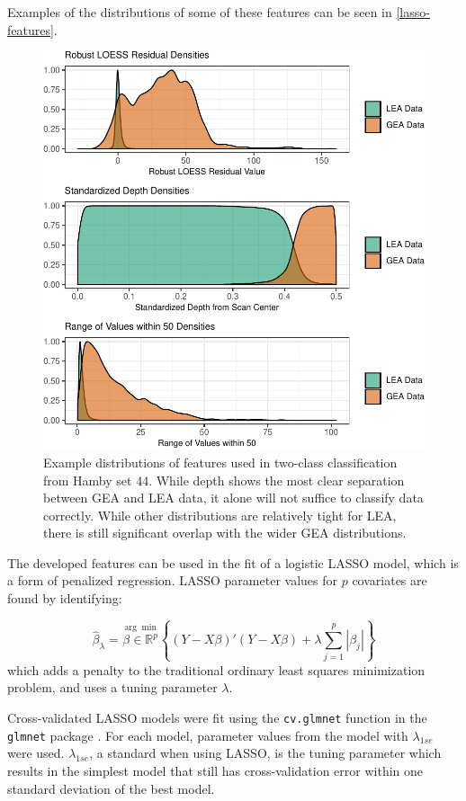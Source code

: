 \documentclass[12pt]{article}
\begin{document}
Examples of the distributions of some of these features can be seen in
\autoref{lasso-features}.

\begin{figure}
\centering
\includegraphics{writeup_files/figure-latex/lasso-features-1.pdf}
\caption{\label{lasso-features}Example distributions of features used in
two-class classification from Hamby set 44. While depth shows the most
clear separation between GEA and LEA data, it alone will not suffice to
classify data correctly. While other distributions are relatively tight
for LEA, there is still significant overlap with the wider GEA
distributions.}
\end{figure}

The developed features can be used in the fit of a logistic LASSO model,
which is a form of penalized regression. LASSO parameter values for
\(p\) covariates are found by identifying:

\[
\hat{\beta}_{\lambda} = \stackrel{\arg\min}{\beta \in \mathbb{R}^p} \left\{  (Y - X\beta)'(Y - X\beta) + \lambda \sum_{j=1}^{p}|\beta_j|\right\}
\] which adds a penalty to the traditional ordinary least squares
minimization problem, and uses a tuning parameter \(\lambda\).

Cross-validated LASSO models were fit using the \texttt{cv.glmnet}
function in the \texttt{glmnet} package \cite{glmnet}. For each model,
parameter values from the model with \(\lambda_{1se}\) were used.
\(\lambda_{1se}\), a standard when using LASSO, is the tuning parameter
which results in the simplest model that still has cross-validation
error within one standard deviation of the best model.
\end{document}
